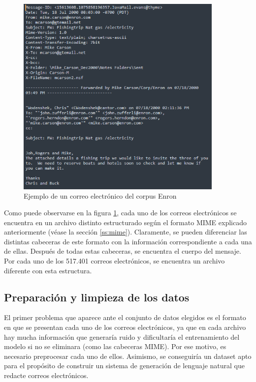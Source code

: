 \begin{figure}[h]
	\centering%
	\centerline{\includegraphics[width = 0.9\textwidth]{Imagenes/Bitmap/email-example.png}}%
	\caption{Ejemplo de un correo electrónico del corpus Enron}%
	\label{fig:emailenron}
\end{figure}

Como puede observarse en la figura \ref{fig:emailenron}, cada uno de los correos electrónicos se encuentra en un archivo distinto estructurado según el formato MIME explicado anteriormente (véase la sección \ref{ss:mime}). Claramente, se pueden diferenciar las distintas cabeceras de este formato con la información correspondiente a cada una de ellas. Después de todas estas cabeceras, se encuentra el cuerpo del mensaje. Por cada uno de los 517.401 correos electrónicos, se encuentra un archivo diferente con esta estructura.

\subsection{Preparación y limpieza de los datos}\label{ss:prep}

El primer problema que aparece ante el conjunto de datos elegidos es el formato en que se presentan cada uno de los correos electrónicos, ya que en cada archivo hay mucha información que generaría ruido y dificultaría el entrenamiento del modelo si no se eliminara (como las cabeceras MIME). Por ese motivo, es necesario preprocesar cada uno de ellos. Asimismo, se conseguiría un dataset apto para el propósito de construir un sistema de generación de lenguaje natural que redacte correos electrónicos.

